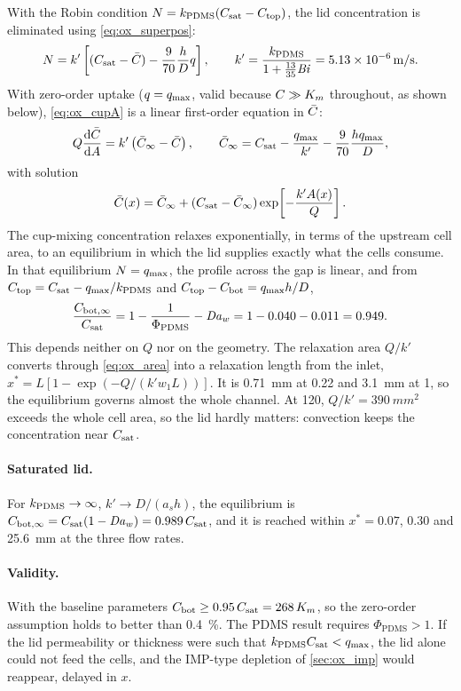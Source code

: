 With the Robin condition $N=k_{\mathrm{PDMS}}(C_{\mathrm{sat}}-C_{\mathrm{top}})$, the lid concentration is eliminated using \cref{eq:ox_superpos}:
\begin{equation}
N=k'\left[(C_{\mathrm{sat}}-\bar C)-\frac{9}{70}\frac hDq\right],\qquad
k'=\frac{k_{\mathrm{PDMS}}}{1+\frac{13}{35}\mathit{Bi}}=\SI{5.13e-6}{m/s}.
\label{eq:ox_N}
\end{equation}
With zero-order uptake ($q=q_{\max}$, valid because $C\gg K_{m}$ throughout, as shown below), \cref{eq:ox_cupA} is a linear first-order equation in $\bar C$:
\begin{equation}
Q\frac{\mathrm{d}\bar C}{\mathrm{d} A}=k'\left(\bar C_\infty-\bar C\right),\qquad
\bar C_\infty=C_{\mathrm{sat}}-\frac{q_{\max}}{k'}-\frac{9}{70}\frac{hq_{\max}}{D},
\end{equation}
with solution
\begin{equation}
\bar C(x)=\bar C_\infty+(C_{\mathrm{sat}}-\bar C_\infty)\exp\!\left[-\frac{k'A(x)}{Q}\right].
\label{eq:ox_pdms}
\end{equation}
The cup-mixing concentration relaxes exponentially, in terms of the upstream cell area, to an equilibrium in which the lid supplies exactly what the cells consume. In that equilibrium $N=q_{\max}$, the profile across the gap is linear, and from $C_{\mathrm{top}}=C_{\mathrm{sat}}-q_{\max}/k_{\mathrm{PDMS}}$ and $C_{\mathrm{top}}-C_{\mathrm{bot}}=q_{\max} h/D$,
\begin{equation}
\frac{C_{\mathrm{bot},\infty}}{C_{\mathrm{sat}}}=1-\frac{1}{\Phi_{\mathrm{PDMS}}}-\mathit{Da}_w=1-0.040-0.011=0.949 .
\label{eq:ox_pdms_inf}
\end{equation}
This depends neither on $Q$ nor on the geometry. The relaxation area $Q/k'$ converts through \cref{eq:ox_area} into a relaxation length from the inlet, $x^*=L[1-\exp(-Q/(k'w_1L))]$. It is \SI{0.71}{mm} at \SI{0.22}{\uLmin} and \SI{3.1}{mm} at \SI{1}{\uLmin}, so the equilibrium governs almost the whole channel. At \SI{120}{\uLmin}, $Q/k'=\SI{390}{mm^2}$ exceeds the whole cell area, so the lid hardly matters: convection keeps the concentration near $C_{\mathrm{sat}}$.

\paragraph{Saturated lid.} For $k_{\mathrm{PDMS}}\to\infty$, $k'\to D/(a_sh)$, the equilibrium is $C_{\mathrm{bot},\infty}=C_{\mathrm{sat}}(1-\mathit{Da}_w)=0.989\,C_{\mathrm{sat}}$, and it is reached within $x^*=0.07$, 0.30 and \SI{25.6}{mm} at the three flow rates.

\paragraph{Validity.} With the baseline parameters $C_{\mathrm{bot}}\ge0.95\,C_{\mathrm{sat}}=268\,K_{m}$, so the zero-order assumption holds to better than \SI{0.4}{\percent}. The PDMS result requires $\Phi_{\mathrm{PDMS}}>1$. If the lid permeability or thickness were such that $k_{\mathrm{PDMS}}C_{\mathrm{sat}}<q_{\max}$, the lid alone could not feed the cells, and the IMP-type depletion of \cref{sec:ox_imp} would reappear, delayed in $x$.

